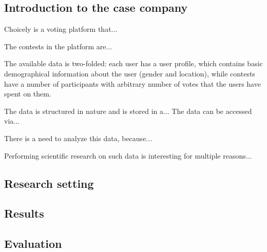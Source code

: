 \subsection{Introduction to the case company}
    Choicely is a voting platform that...
    
    The contests in the platform are...

    The available data is two-folded: each user has a user profile, which contains basic demographical information about the user (gender and location), while contests have a number of participants with arbitrary number of votes that the users have spent on them. 

    The data is structured in nature and is stored in a... The data can be accessed via...

    There is a need to analyze this data, because...

    Performing scientific research on such data is interesting for multiple reasons...

\subsection{Research setting}


\subsection{Results}


\subsection{Evaluation}
